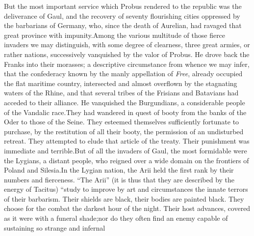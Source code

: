 



But the most important service which Probus rendered to the
republic was the deliverance of Gaul, and the recovery of seventy
flourishing cities oppressed by the barbarians of Germany, who,
since the death of Aurelian, had ravaged that great province with
impunity.\footnotemark[34] Among the various multitude of those fierce invaders
we may distinguish, with some degree of clearness, three great
armies, or rather nations, successively vanquished by the valor
of Probus. He drove back the Franks into their morasses; a
descriptive circumstance from whence we may infer, that the
confederacy known by the manly appellation of \textit{Free}, already
occupied the flat maritime country, intersected and almost
overflown by the stagnating waters of the Rhine, and that several
tribes of the Frisians and Batavians had acceded to their
alliance. He vanquished the Burgundians, a considerable people of
the Vandalic race.\footnotemark[341] They had wandered in quest of booty from
the banks of the Oder to those of the Seine. They esteemed
themselves sufficiently fortunate to purchase, by the restitution
of all their booty, the permission of an undisturbed retreat.
They attempted to elude that article of the treaty. Their
punishment was immediate and terrible.\footnotemark[35] But of all the invaders
of Gaul, the most formidable were the Lygians, a distant people,
who reigned over a wide domain on the frontiers of Poland and
Silesia.\footnotemark[36] In the Lygian nation, the Arii held the first rank by
their numbers and fierceness. “The Arii” (it is thus that they
are described by the energy of Tacitus) “study to improve by art
and circumstances the innate terrors of their barbarism. Their
shields are black, their bodies are painted black. They choose
for the combat the darkest hour of the night. Their host
advances, covered as it were with a funeral shade;\footnotemark[37] nor do they
often find an enemy capable of sustaining so strange and infernal
